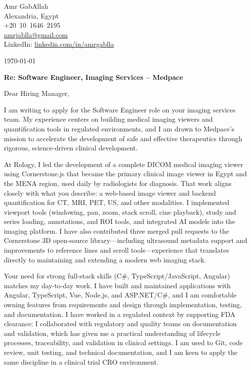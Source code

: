 \documentclass[11pt,a4paper]{article}
\begin{document}
\noindent
Amr GabAllah\\
Alexandria, Egypt\\
+20~10~1646~2195\\
\href{mailto:amrjablla@gmail.com}{amrjablla@gmail.com}\\
LinkedIn: \href{https://linkedin.com/in/amrgablla}{linkedin.com/in/amrgablla}

\vspace{1em}
\today

\vspace{1em}
\noindent
\textbf{Re: Software Engineer, Imaging Services -- Medpace}

\vspace{0.5em}
Dear Hiring Manager,

I am writing to apply for the Software Engineer role on your imaging services team. My experience centers on building medical imaging viewers and quantification tools in regulated environments, and I am drawn to Medpace's mission to accelerate the development of safe and effective therapeutics through rigorous, science-driven clinical development.

At Rology, I led the development of a complete DICOM medical imaging viewer using Cornerstone.js that became the primary clinical image viewer in Egypt and the MENA region, used daily by radiologists for diagnosis. That work aligns closely with what you describe: a web-based image viewer and backend quantification for CT, MRI, PET, US, and other modalities. I implemented viewport tools (windowing, pan, zoom, stack scroll, cine playback), study and series loading, annotations, and ROI tools, and integrated AI models into the imaging platform. I have also contributed three merged pull requests to the Cornerstone 3D open-source library---including ultrasound metadata support and improvements to reference lines and scroll tools---experience that translates directly to maintaining and extending a modern web imaging stack.

Your need for strong full-stack skills (C\#, TypeScript/JavaScript, Angular) matches my day-to-day work. I have built and maintained applications with Angular, TypeScript, Vue, Node.js, and ASP.NET/C\#, and I am comfortable owning features from requirements and design through implementation, testing, and documentation. I have worked in a regulated context by supporting FDA clearance: I collaborated with regulatory and quality teams on documentation and validation, which has given me a practical understanding of lifecycle processes, traceability, and validation in clinical settings. I am used to Git, code review, unit testing, and technical documentation, and I am keen to apply the same discipline in a clinical trial CRO environment.
\end{document}
